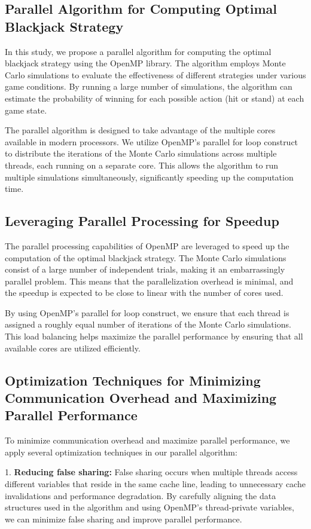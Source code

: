 \documentclass[twocolumn]{report}
\begin{document}
\subsection{Parallel Algorithm for Computing Optimal Blackjack Strategy}
In this study, we propose a parallel algorithm for computing the optimal blackjack strategy using the OpenMP library. The algorithm employs Monte Carlo simulations to evaluate the effectiveness of different strategies under various game conditions. By running a large number of simulations, the algorithm can estimate the probability of winning for each possible action (hit or stand) at each game state.

The parallel algorithm is designed to take advantage of the multiple cores available in modern processors. We utilize OpenMP's parallel for loop construct to distribute the iterations of the Monte Carlo simulations across multiple threads, each running on a separate core. This allows the algorithm to run multiple simulations simultaneously, significantly speeding up the computation time.

\subsection{Leveraging Parallel Processing for Speedup}
The parallel processing capabilities of OpenMP are leveraged to speed up the computation of the optimal blackjack strategy. The Monte Carlo simulations consist of a large number of independent trials, making it an embarrassingly parallel problem. This means that the parallelization overhead is minimal, and the speedup is expected to be close to linear with the number of cores used.

By using OpenMP's parallel for loop construct, we ensure that each thread is assigned a roughly equal number of iterations of the Monte Carlo simulations. This load balancing helps maximize the parallel performance by ensuring that all available cores are utilized efficiently.

\subsection{Optimization Techniques for Minimizing Communication Overhead and Maximizing Parallel Performance}
To minimize communication overhead and maximize parallel performance, we apply several optimization techniques in our parallel algorithm:

1. \textbf{Reducing false sharing:} False sharing occurs when multiple threads access different variables that reside in the same cache line, leading to unnecessary cache invalidations and performance degradation. By carefully aligning the data structures used in the algorithm and using OpenMP's thread-private variables, we can minimize false sharing and improve parallel performance.
\end{document}
